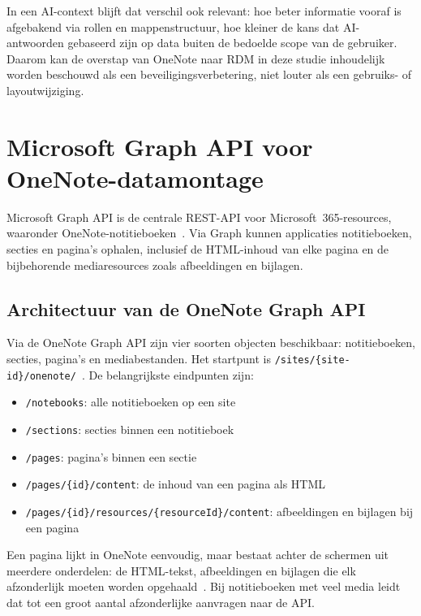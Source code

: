 In een AI-context blijft dat verschil ook relevant: hoe beter informatie vooraf is afgebakend via rollen en mappenstructuur, hoe kleiner de kans dat AI-antwoorden gebaseerd zijn op data buiten de bedoelde scope van de gebruiker. Daarom kan de overstap van OneNote naar RDM in deze studie inhoudelijk worden beschouwd als een beveiligingsverbetering, niet louter als een gebruiks- of layoutwijziging.

\section{Microsoft Graph API voor OneNote-datamontage}
\label{sec:msgraph-onenote}

Microsoft Graph API is de centrale REST-API voor Microsoft~365-resources, waaronder OneNote-notitieboeken~\autocite{msgraph2025notes}. Via Graph kunnen applicaties notitieboeken, secties en pagina's ophalen, inclusief de HTML-inhoud van elke pagina en de bijbehorende mediaresources zoals afbeeldingen en bijlagen.

\subsection{Architectuur van de OneNote Graph API}
\label{subsec:onenote-graph-endpoints}

Via de OneNote Graph API zijn vier soorten objecten beschikbaar: notitieboeken, secties, pagina's en mediabestanden. Het startpunt is \texttt{/sites/\{site-id\}/onenote/}~\autocite{msgraph2025notes}. De belangrijkste eindpunten zijn:

\begin{itemize}
    \item \texttt{/notebooks}: alle notitieboeken op een site
    \item \texttt{/sections}: secties binnen een notitieboek
    \item \texttt{/pages}: pagina's binnen een sectie
    \item \texttt{/pages/\{id\}/content}: de inhoud van een pagina als HTML
    \item \texttt{/pages/\{id\}/resources/\{resourceId\}/content}: afbeeldingen en bijlagen bij een pagina
\end{itemize}

Een pagina lijkt in OneNote eenvoudig, maar bestaat achter de schermen uit meerdere onderdelen: de HTML-tekst, afbeeldingen en bijlagen die elk afzonderlijk moeten worden opgehaald~\autocite{msgraph2025notes}. Bij notitieboeken met veel media leidt dat tot een groot aantal afzonderlijke aanvragen naar de API.

